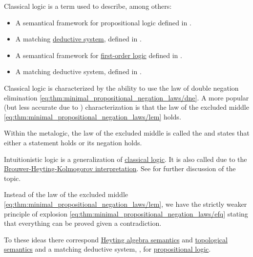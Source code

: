 \begin{remark}\label{rem:classical_logic}
  Classical logic is a term used to describe, among others:
  \begin{itemize}
    \item A semantical framework for propositional logic defined in .
    \item A matching \hyperref[def:deductive_system]{deductive system}, defined in .
    \item A semantical framework for \hyperref[subsec:first_order_logic]{first-order logic} defined in .
    \item A matching deductive system, defined in .
  \end{itemize}

  Classical logic is characterized by the ability to use the law of double negation elimination \eqref{eq:thm:minimal_propositional_negation_laws/dne}. A more popular (but less accurate due to ) characterization is that the law of the excluded middle \eqref{eq:thm:minimal_propositional_negation_laws/lem} holds.

  Within the metalogic, the law of the excluded middle is called the  and states that either a statement holds or its negation holds.
\end{remark}

\begin{remark}\label{rem:intuitionistic_logic}
  Intuitionistic logic is a generalization of \hyperref[rem:classical_logic]{classical logic}. It is also called  due to the \hyperref[rem:brouwer_heyting_kolmogorov_interpretation]{Brouwer-Heyting-Kolmogorov interpretation}. See  for further discussion of the topic.

  Instead of the law of the excluded middle \eqref{eq:thm:minimal_propositional_negation_laws/lem}, we have the strictly weaker principle of explosion \eqref{eq:thm:minimal_propositional_negation_laws/efq} stating that everything can be proved given a contradiction.

  To these ideas there correspond \hyperref[def:propositional_heyting_algebra_semantics]{Heyting algebra semantics} and \hyperref[def:propositional_topological_semantics]{topological semantics} and a matching deductive system, , for \hyperref[subsec:propositional_logic]{propositional logic}.
\end{remark}

